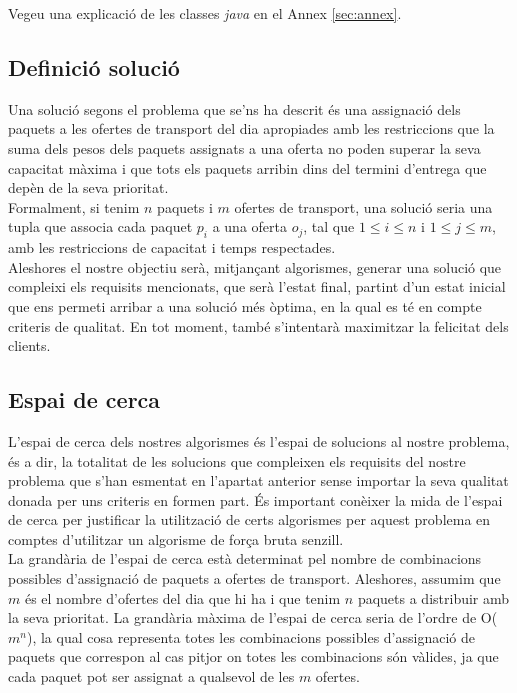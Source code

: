 \documentclass[a4paper]{article}
\begin{document}
	Vegeu una explicació de les classes \textit{java} en el Annex \ref{sec:annex}.
	
	\subsection{Definició solució}
	
	Una solució segons el problema que se'ns ha descrit és una assignació dels paquets a les ofertes de transport del dia apropiades amb les restriccions que la suma dels pesos dels paquets assignats a una oferta no poden superar la seva capacitat màxima i que tots els paquets arribin dins del termini d'entrega que depèn de la seva prioritat. \\
	
	Formalment, si tenim $n$ paquets i $m$ ofertes de transport, una solució seria una tupla que associa cada paquet $p_i$ a una oferta $o_j$, tal que $1 \leq i \leq n$ i $1 \leq j \leq m$, amb les restriccions de capacitat i temps respectades. \\
	
	Aleshores el nostre objectiu serà, mitjançant algorismes, generar una solució que compleixi els requisits mencionats, que serà l'estat final, partint d'un estat inicial que ens permeti arribar a una solució més òptima, en la qual es té en compte criteris de qualitat. En tot moment, també s'intentarà maximitzar la felicitat dels clients. \\
	
	\subsection{Espai de cerca}
	
	L'espai de cerca dels nostres algorismes és l'espai de solucions al nostre problema, és a dir, la totalitat de les solucions que compleixen els requisits del nostre problema que s'han esmentat en l'apartat anterior sense importar la seva qualitat donada per uns criteris en formen part. És important conèixer la mida de l'espai de cerca per justificar la utilització de certs algorismes per aquest problema en comptes d'utilitzar un algorisme de força bruta senzill. \\
	
	La grandària de l'espai de cerca està determinat pel nombre de combinacions possibles d'assignació de paquets a ofertes de transport. Aleshores, assumim que $m$ és el nombre d'ofertes del dia que hi ha i que tenim $n$ paquets a distribuir amb la seva prioritat. La grandària màxima de l'espai de cerca seria de l'ordre de O($m^n$), la qual cosa representa totes les combinacions possibles d'assignació de paquets que correspon al cas pitjor on totes les combinacions són vàlides, ja que cada paquet pot ser assignat a qualsevol de les $m$ ofertes. \\
	
\end{document}
